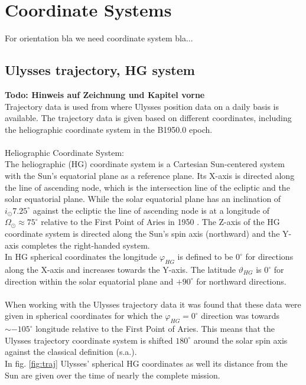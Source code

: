 \section{Coordinate Systems}
For orientation bla we need coordinate system bla...

%
\subsection{Ulysses trajectory, HG system}
\textbf{Todo: Hinweis auf Zeichnung und Kapitel vorne}\\
Trajectory data is used from \citet{ulysses-data-archive} where Ulysses position data on a daily basis is available. The trajectory data is given based on different coordinates, including the heliographic coordinate system in the B1950.0 epoch.
\\ \\
Heliographic Coordinate System:\\
The heliographic (HG) coordinate system is a Cartesian Sun-centered system with the Sun's equatorial plane as a reference plane. Its X-axis is directed along the line of ascending node, which is the intersection line of the ecliptic and the solar equatorial plane. While the solar equatorial plane has an inclination of $i_\odot 7.25 ^\circ$ against the ecliptic \citep{fraenz_harper} the line of ascending node is at a longitude of $\Omega_\odot \approx 75^\circ$ relative to the First Point of Aries in 1950 \citep{nasa-earth-coord}. The Z-axis of the HG coordinate system is directed along the Sun's spin axis (northward) and the Y-axis completes the right-handed system. \\
In HG spherical coordinates the longitude $\varphi_{HG}$ is defined to be $0^\circ$ for directions along the X-axis and increases towards the Y-axis. The latitude $\vartheta_{HG}$ is $0^\circ$ for direction within the solar equatorial plane and $+90^\circ$ for northward directions.\\ \\
%
%
When working with the Ulysses trajectory data it was found that these data were given in spherical coordinates for which the $\varphi_{HG} = 0^\circ$ direction was towards $\sim -105 ^\circ$ longitude relative to the First Point of Aries. This means that the Ulysses trajectory coordinate system is shifted $180^\circ$ around the solar spin axis against the classical definition (s.a.).\\
In fig. \ref{fig:traj} Ulysses' spherical HG coordinates as well its distance from the Sun are given over the time of nearly the complete mission.


